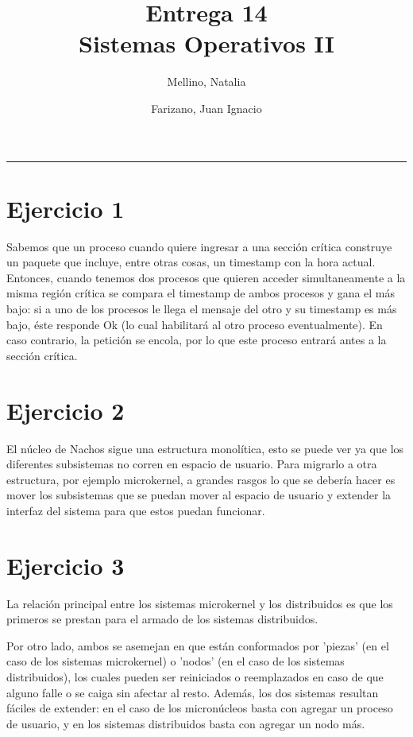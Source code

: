 \documentclass[11pt]{article}
\title{
    Entrega 14 \\
    \large Sistemas Operativos II}
\author{Mellino, Natalia \and Farizano, Juan Ignacio}
\date{}
\begin{document}
\maketitle

\noindent\rule{\textwidth}{1pt}

\section*{Ejercicio 1}

Sabemos que un proceso cuando quiere ingresar a una sección crítica construye un paquete
que incluye, entre otras cosas, un timestamp con la hora actual. Entonces, cuando tenemos
dos procesos que quieren acceder simultaneamente a la misma región crítica se compara el 
timestamp de ambos procesos y gana el más bajo: si a uno de los procesos le llega el 
mensaje del otro y su timestamp es más bajo, éste responde Ok (lo cual habilitará al
otro proceso eventualmente). En caso contrario, la petición se encola, por lo que este
proceso entrará antes a la sección crítica.

\section*{Ejercicio 2}

El núcleo de Nachos sigue una estructura monolítica, esto se puede ver ya que
los diferentes subsistemas no corren en espacio de usuario. Para migrarlo a otra
estructura, por ejemplo microkernel, a grandes rasgos lo que se debería hacer es
mover los subsistemas que se puedan mover al espacio de usuario y extender la interfaz
del sistema para que estos puedan funcionar.

\section*{Ejercicio 3}

La relación principal entre los sistemas microkernel y los distribuidos es que
los primeros se prestan para el armado de los sistemas distribuidos. 

Por otro lado, ambos se asemejan en que están conformados por 'piezas' (en el caso de los sistemas 
microkernel) o 'nodos' (en el caso de los sistemas distribuidos), los cuales pueden ser reiniciados o
reemplazados en caso de que alguno falle o se caiga sin afectar al resto. Además, los dos sistemas 
resultan fáciles de extender: en el caso de los micronúcleos basta con agregar un proceso de usuario, y 
en los sistemas distribuidos basta con agregar un nodo más. 
\end{document}
